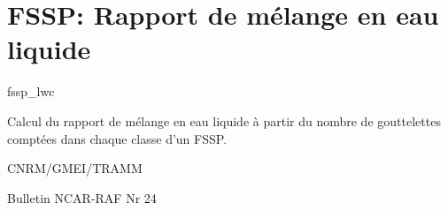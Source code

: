 %
\section{FSSP: Rapport de m\'elange en eau liquide }

 {\sf fssp\_lwc}

Calcul du rapport de m\'elange en eau liquide \`a
partir du nombre de gouttelettes compt\'ees dans chaque
classe d'un FSSP.

\bigskip





CNRM/GMEI/TRAMM

Bulletin NCAR-RAF Nr 24 \cite{RAF-24}
